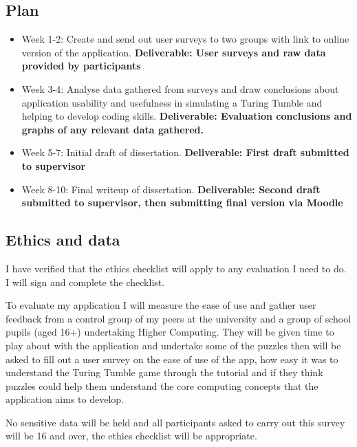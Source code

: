 \documentclass[11pt]{article}
\begin{document}
\subsection{Plan}\label{plan}

\begin{itemize}
    \item Week 1-2: Create and send out user surveys to two groups with link to online version of the application. \textbf{Deliverable: User surveys and raw data provided by participants}
    \item Week 3-4: Analyse data gathered from surveys and draw conclusions about application usability and usefulness in simulating a Turing Tumble and helping to develop coding skills. \textbf{Deliverable: Evaluation conclusions and graphs of any relevant data gathered.}
    \item Week 5-7: Initial draft of dissertation. \textbf{Deliverable: First draft submitted to supervisor}
    \item Week 8-10: Final writeup of dissertation. \textbf{Deliverable: Second draft submitted to supervisor, then submitting final version via Moodle}
\end{itemize}


\subsection{Ethics and data}\label{ethics}

I have verified that the ethics checklist will apply to any evaluation I need to do. I will sign and complete the checklist.

To evaluate my application I will measure the ease of use and gather user feedback from a control group of my peers at the university and a group of school pupils (aged 16+) undertaking Higher Computing. They will be given time to play about with the application and undertake some of the puzzles then will be asked to fill out a user survey on the ease of use of the app, how easy it was to understand the Turing Tumble game through the tutorial and if they think puzzles could help them understand the core computing concepts that the application aims to develop.

No sensitive data will be held and all participants asked to carry out this survey will be 16 and over, the ethics checklist will be appropriate.
\end{document}
